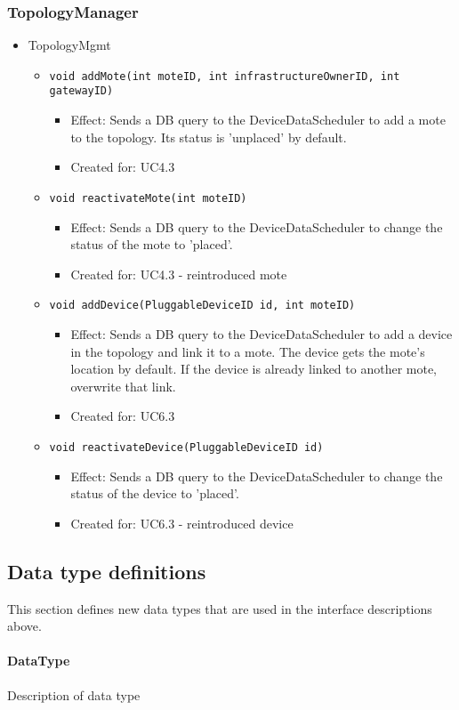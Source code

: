     \subsubsection{TopologyManager}
        \begin{itemize}
        	\item TopologyMgmt
        	\begin{itemize}
        		\item \texttt{void addMote(int moteID, int infrastructureOwnerID, int gatewayID)}
            		\begin{itemize}
            			\item Effect: Sends a DB query to the DeviceDataScheduler to add a mote to the topology. Its status is 'unplaced' by default.
            			\item Created for: UC4.3
            		\end{itemize}
                \item \texttt{void reactivateMote(int moteID)}
                    \begin{itemize}
                        \item Effect: Sends a DB query to the DeviceDataScheduler to change the status of the mote to 'placed'.
                        \item Created for: UC4.3 - reintroduced mote
                    \end{itemize}
                \item \texttt{void addDevice(PluggableDeviceID id, int moteID)}
                    \begin{itemize}
                        \item Effect: Sends a DB query to the DeviceDataScheduler to add a device in the topology and link it to a mote.
                              The device gets the mote's location by default. If the device is already linked to another mote, overwrite that link.
                        \item Created for: UC6.3
                    \end{itemize}
                \item \texttt{void reactivateDevice(PluggableDeviceID id)}
                    \begin{itemize}
                        \item Effect: Sends a DB query to the DeviceDataScheduler to change the status of the device to 'placed'.
                        \item Created for: UC6.3 - reintroduced device
                    \end{itemize}
        	\end{itemize}
        \end{itemize}

\subsection{Data type definitions}
    This section defines new data types that are used in the interface descriptions above.

    \paragraph{DataType}
        Description of data type
